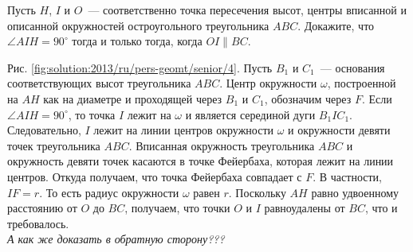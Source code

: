 \problem
Пусть $H$, $I$ и $O$~--- соответственно точка пересечения высот, центры
вписанной и описанной окружностей остроугольного треугольника $ABC$.
Докажите, что $\angle AIH = 90^\circ$ тогда и только тогда, когда
$OI \parallel BC$.

%
\label{solution:2013/ru/pers-geomt/senior/4}
Рис. \ref{fig:solution:2013/ru/pers-geomt/senior/4}.
Пусть $B_1$ и $C_1$~--- основания соответствующих высот треугольника $ABC$.
Центр окружности $\omega$, построенной на $AH$ как на диаметре и проходящей
через $B_1$ и $C_1$, обозначим через $F$.
Если $\angle AIH = 90^\circ$, то точка $I$ лежит на $\omega$ и является
серединой дуги $B_1 I C_1$.
Следовательно, $I$ лежит на линии центров окружности $\omega$ и окружности
девяти точек треугольника $ABC$.
Вписанная окружность треугольника $ABC$ и окружность девяти точек касаются в
точке Фейербаха, которая лежит на линии центров.
Откуда получаем, что точка Фейербаха совпадает с $F$.
В частности, $I F = r$.
То есть радиус окружности $\omega$ равен $r$.
Поскольку $AH$ равно удвоенному расстоянию от $O$ до $BC$, получаем, что точки
$O$ и $I$ равноудалены от $BC$, что и требовалось.
\\
\emph{А как же доказать в обратную сторону???}
\endproblem
